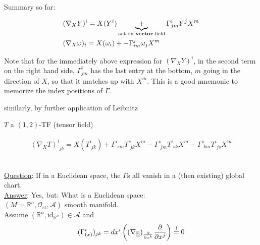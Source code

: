 \documentclass[10pt]{amsart}
\begin{document}
\begin{multicols*}{2}
Summary so far:



	

\[
\begin{aligned}
& ( \nabla_X Y)^i = X(Y^i) \underbrace{+}_{\text{act on \textbf{vector} field}} \Gamma^i_{jm }  Y^j X^m \\
& (\nabla_X \omega)_i = X(\omega_i) + - \Gamma^j_{im} \omega_j X^m
\end{aligned}
\]

	
	
	Note that for the immediately above expression for $(\nabla_X Y)^i$, in the second term on the right hand side, $\Gamma_{jm}^i$ has the last entry at the bottom, $m$ going in the direction of $X$, so that it matches up with $X^m$. This is a good mnemonic to memorize the index positions of $\Gamma$. 
	
	similarly, by further application of Leibnitz
	
	$T$ a $(1,2)$-TF (tensor field)
	
	\[
	\begin{aligned}
	(\nabla_X T)^i_{ \, \, jk } = X(T^i_{ \, \, jk} ) + \Gamma^i_{ \, \, s m } T^s_{ \, \, jk} X^m - \Gamma^s_{ \, \, jm} T^i_{ \, \, sk} X^m - \Gamma^s_{ \, \, km} T^i_{ \,\, js} X^m
	\end{aligned}
	\]

\quad \\

\underline{Question}: If in a Euclidean space, the $\Gamma$s all vanish in a (then existing) global chart. \\	

\underline{Answer}: Yes, but:	What is a Euclidean space: \\
	$(M = \mathbb{R}^n, \mathcal{O}_{\text{st}}, \mathcal{A})$ smooth manifold. \\
	Assume $(\mathbb{R}^n, \text{id}_{\mathbb{R}^n} ) \in \mathcal{A}$ and 
	\[
	(\Gamma^i_{(x)})_{jk} = dx^i \left( (\nabla_{\text{\underline{E}}})_{ \frac{ \partial }{ \partial x^k} } \frac{ \partial }{ \partial x^j} \right) \overset{!}{=} 0 
	\]


\end{multicols*}
\end{document}

